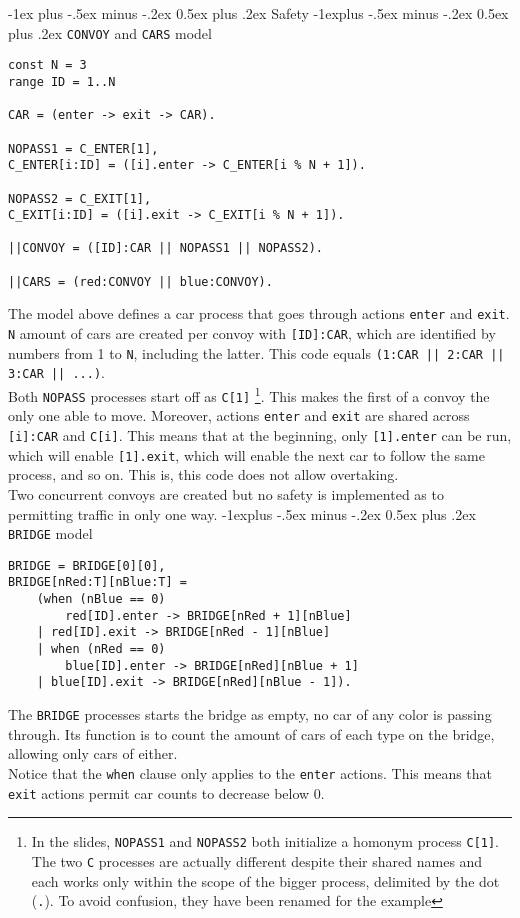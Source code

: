 \documentclass[10pt,landscape]{article}
\makeatletter
\renewcommand{\section}{\@startsection{section}{1}{0mm}%
                                {-1ex plus -.5ex minus -.2ex}%
                                {0.5ex plus .2ex}%
                                {\normalfont\large\bfseries}}
\renewcommand{\subsection}{\@startsection{subsection}{2}{0mm}%
                                {-1explus -.5ex minus -.2ex}%
                                {0.5ex plus .2ex}%
                                {\normalfont\normalsize\bfseries}}
\makeatother
\begin{document}
\begin{multicols}{3}
\section{Safety}
\subsection{\texttt{CONVOY} and \texttt{CARS} model}
\begin{verbatim}
const N = 3
range ID = 1..N

CAR = (enter -> exit -> CAR).

NOPASS1 = C_ENTER[1],
C_ENTER[i:ID] = ([i].enter -> C_ENTER[i % N + 1]).

NOPASS2 = C_EXIT[1],
C_EXIT[i:ID] = ([i].exit -> C_EXIT[i % N + 1]).

||CONVOY = ([ID]:CAR || NOPASS1 || NOPASS2).

||CARS = (red:CONVOY || blue:CONVOY).
\end{verbatim}
The model above defines a car process that goes through actions \texttt{enter} and \texttt{exit}. \texttt{N} amount of cars are created per convoy with \texttt{[ID]:CAR}, which are identified by numbers from 1 to \texttt{N}, including the latter. This code equals \texttt{(1:CAR || 2:CAR || 3:CAR || ...)}. \\
Both \texttt{NOPASS} processes start off as \texttt{C[1]} \footnote{In the slides, \texttt{NOPASS1} and \texttt{NOPASS2} both initialize a homonym process \texttt{C[1]}. The two \texttt{C} processes are actually different despite their shared names and each works only within the scope of the bigger process, delimited by the dot (\texttt{.}). To avoid confusion, they have been renamed for the example}. This makes the first of a convoy the only one able to move. Moreover, actions \texttt{enter} and \texttt{exit} are shared across \texttt{[i]:CAR} and \texttt{C[i]}. This means that at the beginning, only \texttt{[1].enter} can be run, which will enable \texttt{[1].exit}, which will enable the next car to follow the same process, and so on. This is, this code does not allow overtaking. \\
Two concurrent convoys are created but no safety is implemented as to permitting traffic in only one way.
\subsection{\texttt{BRIDGE} model}
\begin{verbatim}
BRIDGE = BRIDGE[0][0],
BRIDGE[nRed:T][nBlue:T] =
    (when (nBlue == 0)
        red[ID].enter -> BRIDGE[nRed + 1][nBlue]
    | red[ID].exit -> BRIDGE[nRed - 1][nBlue]
    | when (nRed == 0)
        blue[ID].enter -> BRIDGE[nRed][nBlue + 1]
    | blue[ID].exit -> BRIDGE[nRed][nBlue - 1]).
\end{verbatim}
The \texttt{BRIDGE} processes starts the bridge as empty, no car of any color is passing through. Its function is to count the amount of cars of each type on the bridge, allowing only cars of either. \\
Notice that the \texttt{when} clause only applies to the \texttt{enter} actions. This means that \texttt{exit} actions permit car counts to decrease below 0.

\end{multicols}
\end{document}
